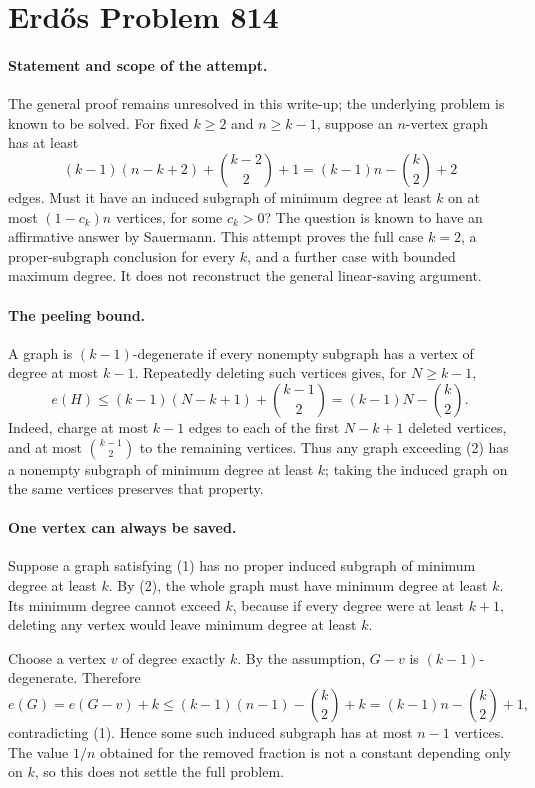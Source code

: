 \section*{Erd\H{o}s Problem 814}

\paragraph{Statement and scope of the attempt.}
The general proof remains unresolved in this write-up; the underlying problem is known to be solved.
For fixed \(k\geq2\) and \(n\geq k-1\), suppose an \(n\)-vertex graph has at least
\[
 (k-1)(n-k+2)+\binom{k-2}{2}+1
 =(k-1)n-\binom{k}{2}+2
\tag{1}
\]
edges. Must it have an induced subgraph of minimum degree at least \(k\) on at most \((1-c_k)n\) vertices, for some \(c_k>0\)? The question is known to have an affirmative answer by Sauermann. This attempt proves the full case \(k=2\), a proper-subgraph conclusion for every \(k\), and a further case with bounded maximum degree. It does not reconstruct the general linear-saving argument.

\paragraph{The peeling bound.}
A graph is \((k-1)\)-degenerate if every nonempty subgraph has a vertex of degree at most \(k-1\). Repeatedly deleting such vertices gives, for \(N\geq k-1\),
\[
 e(H)\leq(k-1)(N-k+1)+\binom{k-1}{2}
 =(k-1)N-\binom{k}{2}.
\tag{2}
\]
Indeed, charge at most \(k-1\) edges to each of the first \(N-k+1\) deleted vertices, and at most \(\binom{k-1}{2}\) to the remaining vertices. Thus any graph exceeding (2) has a nonempty subgraph of minimum degree at least \(k\); taking the induced graph on the same vertices preserves that property.

\paragraph{One vertex can always be saved.}
Suppose a graph satisfying (1) has no proper induced subgraph of minimum degree at least \(k\). By (2), the whole graph must have minimum degree at least \(k\). Its minimum degree cannot exceed \(k\), because if every degree were at least \(k+1\), deleting any vertex would leave minimum degree at least \(k\).

Choose a vertex \(v\) of degree exactly \(k\). By the assumption, \(G-v\) is \((k-1)\)-degenerate. Therefore
\[
 e(G)=e(G-v)+k
 \leq(k-1)(n-1)-\binom{k}{2}+k
 =(k-1)n-\binom{k}{2}+1,
\]
contradicting (1). Hence some such induced subgraph has at most \(n-1\) vertices. The value \(1/n\) obtained for the removed fraction is not a constant depending only on \(k\), so this does not settle the full problem.

